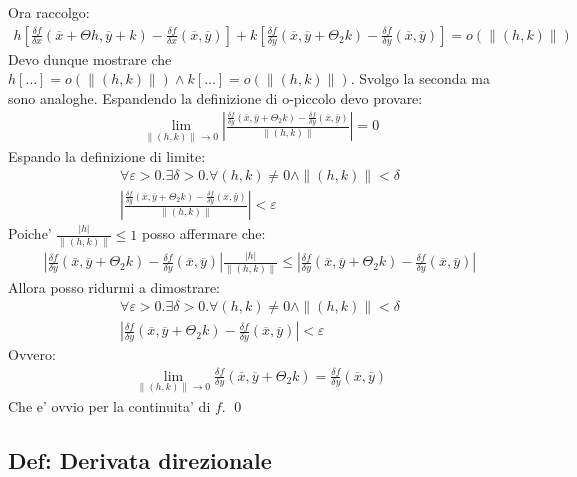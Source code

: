 \documentclass{article}
\begin{document}
Ora raccolgo:
\begin{align*}
  h[\frac{\delta f}{\delta x}(\overline{x} + \Theta h, \overline{y} + k) -
  \frac{\delta f}{\delta x}(\overline{x}, \overline{y})] +
  k[\frac{\delta f}{\delta y}(\overline{x}, \overline{y} + \Theta_2k) -
  \frac{\delta f}{\delta y}(\overline{x}, \overline{y})] = o(\|(h,k)\|)
\end{align*}
Devo dunque mostrare che $h[\ldots] = o(\|(h,k)\|) \wedge k[\ldots] = o(\|(h,k)\|)$.
Svolgo la seconda ma sono analoghe. Espandendo la definizione di o-piccolo devo provare:
\begin{align*}
  \lim_{\|(h,k)\| \to 0} |\frac{
    \frac{\delta f}{\delta y}(\overline{x}, \overline{y} + \Theta_2k) -
    \frac{\delta f}{\delta y}(\overline{x}, \overline{y})
  }{\|(h,k)\|}| = 0
\end{align*}
Espando la definizione di limite:
\begin{align*}
  \forall \varepsilon > 0. \exists \delta > 0. \forall (h,k) \neq 0 \wedge \|(h,k)\| < \delta \\
  |\frac{
    \frac{\delta f}{\delta y}(\overline{x}, \overline{y} + \Theta_2k) -
    \frac{\delta f}{\delta y}(\overline{x}, \overline{y})
  }{\|(h,k)\|}| < \varepsilon
\end{align*}
Poiche' $\frac{|h|}{\|(h,k)\|} \leq 1$ posso affermare che:
\begin{align*}
  |\frac{\delta f}{\delta y}(\overline{x}, \overline{y} + \Theta_2k) - \frac{\delta f}{\delta y}(\overline{x}, \overline{y})|
  \frac{|h|}{\|(h,k)\|} \leq |\frac{\delta f}{\delta y}(\overline{x}, \overline{y} + \Theta_2k) - \frac{\delta f}{\delta y}(\overline{x}, \overline{y})|
\end{align*}
Allora posso ridurmi a dimostrare:
\begin{align*}
  \forall \varepsilon > 0. \exists \delta > 0. \forall (h,k) \neq 0 \wedge \|(h,k)\| < \delta \\
  |\frac{\delta f}{\delta y}(\overline{x}, \overline{y} + \Theta_2k) - \frac{\delta f}{\delta y}(\overline{x}, \overline{y})| < \varepsilon
\end{align*}
Ovvero:
\begin{align*}
  \lim_{\|(h,k)\| \to 0} \frac{\delta f}{\delta y}(\overline{x}, \overline{y} + \Theta_2k) = \frac{\delta f}{\delta y}(\overline{x}, \overline{y})
\end{align*}
Che e' ovvio per la continuita' di $f$. \qed

\subsection{Def: Derivata direzionale}
\end{document}
